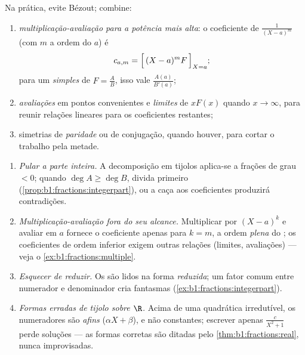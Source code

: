\begin{method}\label{met:b1:fractions:compute}
Na prática, evite Bézout; combine:
\begin{enumerate}
  \item \emph{multiplicação-avaliação para a potência mais alta}: o
        coeficiente de $\frac{1}{(X-a)^m}$ (com $m$ a ordem do  $a$) é
        \[
        c_{a,m} = \Bigl[\,(X - a)^m F\,\Bigr]_{X = a};
        \]
        para um  \emph{simples} de $F = \frac AB$, isso vale
        $\frac{A(a)}{B'(a)}$;
  \item \emph{avaliações} em pontos convenientes e \emph{limites} de
        $xF(x)$ quando $x \to \infty$, para reunir relações lineares para os
        coeficientes restantes;
  \item simetrias de \emph{paridade} ou de conjugação, quando houver,
        para cortar o trabalho pela metade.
\end{enumerate}
\end{method}

\begin{remark}\label{rem:b1:fractions:pitfalls}
\begin{enumerate}
  \item \emph{Pular a parte inteira.} A decomposição em tijolos
        aplica-se a frações de grau $< 0$; quando $\deg A \geq
        \deg B$, divida primeiro
        (\cref{prop:b1:fractions:integerpart}), ou a
        caça aos coeficientes produzirá contradições.
  \item \emph{Multiplicação-avaliação fora do seu alcance.} Multiplicar
        por $(X - a)^k$ e avaliar em $a$ fornece o coeficiente
        apenas para $k = m$, a ordem \emph{plena} do ; os
        coeficientes de ordem inferior exigem outras relações (limites,
        avaliações) --- veja o \cref{ex:b1:fractions:multiple}.
  \item \emph{Esquecer de reduzir.} Os  são lidos na
        forma \emph{reduzida}; um fator comum entre numerador
        e denominador cria  fantasmas
        (\cref{ex:b1:fractions:integerpart}).
  \item \emph{Formas erradas de tijolo sobre $\R$.} Acima de uma
        quadrática irredutível, os numeradores são \emph{afins} ($\alpha X +
        \beta$), e não constantes; escrever apenas $\frac{c}{X^2 + 1}$
        perde soluções --- as formas corretas são ditadas pelo
        \cref{thm:b1:fractions:real}, nunca improvisadas.
\end{enumerate}
\end{remark}

